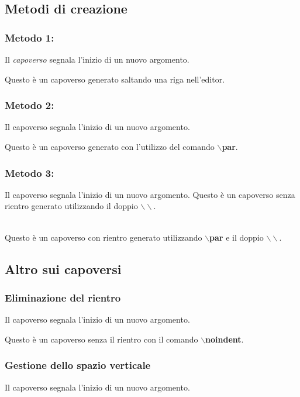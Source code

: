 \documentclass[a4paper,12pt,oneside]{book}
\theoremstyle{plain}
\begin{document}
	\subsection{Metodi di creazione}
	\subsubsection{Metodo 1:}
	Il \emph{capoverso} segnala l'inizio di un nuovo argomento.
	
	Questo è un capoverso generato saltando una riga nell'editor.
	
	\subsubsection{Metodo 2:}
	Il capoverso segnala l'inizio di un nuovo argomento.
	\par Questo è un capoverso generato con l'utilizzo del comando \textbf{$\backslash$par}.
	
	\subsubsection{Metodo 3:}
	Il capoverso segnala l'inizio di un nuovo argomento.\newline
	\newline
	Questo è un capoverso senza rientro generato utilizzando il doppio $\backslash\backslash$.\\
	\\
	\par Questo è un capoverso con rientro generato utilizzando \textbf{$\backslash$par} e il doppio $\backslash\backslash$.
	
	
	\subsection{Altro sui capoversi}
	\subsubsection{Eliminazione del rientro}
	Il capoverso segnala l'inizio di un nuovo argomento.
	
	\noindent Questo è un capoverso senza il rientro con il comando \textbf{$\backslash$noindent}.
	
	\subsubsection{Gestione dello spazio verticale}
	Il capoverso segnala l'inizio di un nuovo argomento.
	
\end{document}
